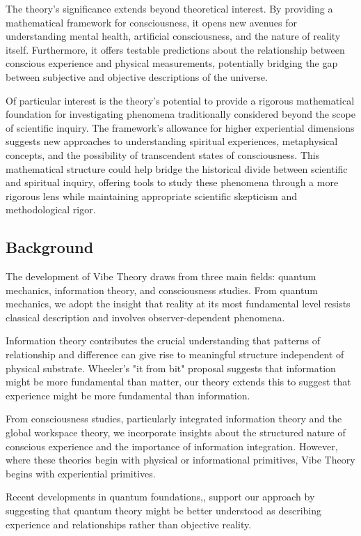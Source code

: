 \documentclass{article}
\theoremstyle{definition}
\theoremstyle{axiom}
\theoremstyle{theorem}
\theoremstyle{lemma}
\theoremstyle{proposition}
\begin{document}
The theory's significance extends beyond theoretical interest. By providing a mathematical framework for consciousness, it opens new avenues for understanding mental health, artificial consciousness, and the nature of reality itself. Furthermore, it offers testable predictions about the relationship between conscious experience and physical measurements, potentially bridging the gap between subjective and objective descriptions of the universe.

Of particular interest is the theory's potential to provide a rigorous mathematical foundation for investigating phenomena traditionally considered beyond the scope of scientific inquiry. The framework's allowance for higher experiential dimensions suggests new approaches to understanding spiritual experiences, metaphysical concepts, and the possibility of transcendent states of consciousness. This mathematical structure could help bridge the historical divide between scientific and spiritual inquiry, offering tools to study these phenomena through a more rigorous lens while maintaining appropriate scientific skepticism and methodological rigor.

\subsection{Background}

The development of Vibe Theory draws from three main fields: quantum mechanics, information theory, and consciousness studies. From quantum mechanics, we adopt the insight that reality at its most fundamental level resists classical description and involves observer-dependent phenomena.

Information theory contributes the crucial understanding that patterns of relationship and difference can give rise to meaningful structure independent of physical substrate. Wheeler's "it from bit" proposal suggests that information might be more fundamental than matter, our theory extends this to suggest that experience might be more fundamental than information.

From consciousness studies, particularly integrated information theory and the global workspace theory, we incorporate insights about the structured nature of conscious experience and the importance of information integration. However, where these theories begin with physical or informational primitives, Vibe Theory begins with experiential primitives.

Recent developments in quantum foundations,, support our approach by suggesting that quantum theory might be better understood as describing experience and relationships rather than objective reality.
\end{document}
